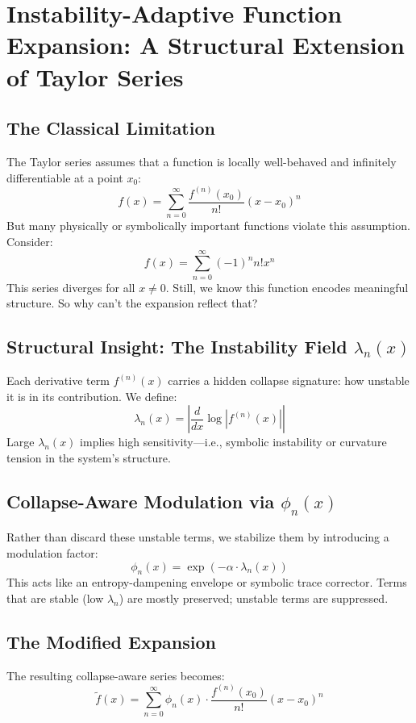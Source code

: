 
\section{Instability-Adaptive Function Expansion: A Structural Extension of Taylor Series}

\subsection{The Classical Limitation}

The Taylor series assumes that a function is locally well-behaved and infinitely differentiable at a point $x_0$:
\[
f(x) = \sum_{n=0}^{\infty} \frac{f^{(n)}(x_0)}{n!} (x - x_0)^n
\]
But many physically or symbolically important functions violate this assumption. Consider:
\[
f(x) = \sum_{n=0}^{\infty} (-1)^n n! x^n
\]
This series diverges for all $x \neq 0$. Still, we know this function encodes meaningful structure. So why can’t the expansion reflect that?

\subsection{Structural Insight: The Instability Field $\lambda_n(x)$}

Each derivative term $f^{(n)}(x)$ carries a hidden collapse signature: how unstable it is in its contribution. We define:
\[
\lambda_n(x) = \left| \frac{d}{dx} \log \left| f^{(n)}(x) \right| \right|
\]
Large $\lambda_n(x)$ implies high sensitivity—i.e., symbolic instability or curvature tension in the system’s structure.

\subsection{Collapse-Aware Modulation via $\phi_n(x)$}

Rather than discard these unstable terms, we stabilize them by introducing a modulation factor:
\[
\phi_n(x) = \exp(-\alpha \cdot \lambda_n(x))
\]
This acts like an entropy-dampening envelope or symbolic trace corrector. Terms that are stable (low $\lambda_n$) are mostly preserved; unstable terms are suppressed.

\subsection{The Modified Expansion}

The resulting collapse-aware series becomes:
\[
\tilde{f}(x) = \sum_{n=0}^\infty \phi_n(x) \cdot \frac{f^{(n)}(x_0)}{n!} (x - x_0)^n
\]

